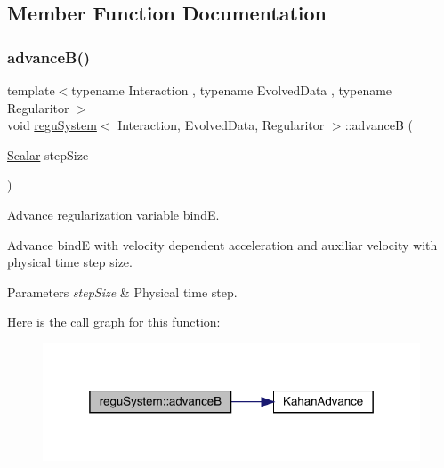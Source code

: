 \subsection{Member Function Documentation}
\mbox{\label{classregu_system_a0a74b00e0e5124a27d0dc90b969f83cc}} 
\subsubsection{\texorpdfstring{advance\+B()}{advanceB()}}
{\footnotesize\ttfamily template$<$typename Interaction , typename Evolved\+Data , typename Regularitor $>$ \\
void \mbox{\hyperlink{classregu_system}{regu\+System}}$<$ Interaction, Evolved\+Data, Regularitor $>$\+::advanceB (\begin{DoxyParamCaption}\item[{\mbox{\hyperlink{classregu_system_aca8ee2c387943164ee3ea68370fc3ac0}{Scalar}}}]{step\+Size }\end{DoxyParamCaption})\hspace{0.3cm}{\ttfamily [private]}}



Advance regularization variable bindE. 

Advance bindE with velocity dependent acceleration and auxiliar velocity with physical time step size. 
\begin{DoxyParams}{Parameters}
{\em step\+Size} & Physical time step. \\
\hline
\end{DoxyParams}
Here is the call graph for this function\+:
\nopagebreak
\begin{figure}[H]
\begin{center}
\leavevmode
\includegraphics[width=319pt]{classregu_system_a0a74b00e0e5124a27d0dc90b969f83cc_cgraph}
\end{center}
\end{figure}
\mbox{\label{classregu_system_ad04ed572a5718219d506af6cd924a395}} 
